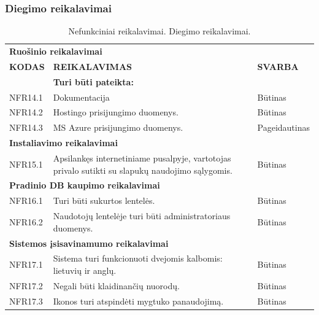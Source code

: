 \documentclass{VUMIFPSkursinis}
\begin{document}
\subsubsection{Diegimo reikalavimai}
\begin{table}[H]
\caption{Nefunkciniai reikalavimai. Diegimo reikalavimai.}
\centering
\normalsize
\begin{tabular}{|p{2cm}|p{10cm}|p{3cm}|}
\hline
\rowcolor{gray!30}
\multicolumn{3}{|l|}{\textbf{Diegimo reikalavimai}} \\ \hline
\multicolumn{3}{|l|}{\textbf{Ruošinio reikalavimai}} \\ \hline
\textbf{KODAS}& \multicolumn{1}{m{10cm}|}{\textbf{REIKALAVIMAS}} & \textbf{SVARBA} \\ \hline
& \multicolumn{2}{|l|}{\textbf{Turi būti pateikta: }} \\ \hline
NFR14.1 & \multicolumn{1}{m{10cm}|}{Dokumentacija} & Būtinas \\ \hline
NFR14.2 & \multicolumn{1}{m{10cm}|}{Hostingo prisijungimo duomenys.} & Būtinas \\ \hline
NFR14.3 & \multicolumn{1}{m{10cm}|}{MS Azure prisijungimo duomenys.} & Pageidautinas \\ \hline
\multicolumn{3}{|l|}{\textbf{Instaliavimo reikalavimai}} \\ \hline
NFR15.1 & \multicolumn{1}{m{10cm}|}{Apsilankęs internetiniame pusalpyje, vartotojas privalo sutikti su slapukų naudojimo sąlygomis.} & Būtinas \\ \hline
\multicolumn{3}{|l|}{\textbf{Pradinio DB kaupimo reikalavimai}} \\ \hline
NFR16.1 & \multicolumn{1}{m{10cm}|}{Turi būti sukurtos lentelės.} & Būtinas \\ \hline
NFR16.2 & \multicolumn{1}{m{10cm}|}{Naudotojų lentelėje turi būti administratoriaus duomenys.} & Būtinas \\ \hline
\multicolumn{3}{|l|}{\textbf{Sistemos įsisavinamumo reikalavimai}} \\ \hline
NFR17.1 & \multicolumn{1}{m{10cm}|}{Sistema turi funkcionuoti dvejomis kalbomis: lietuvių ir anglų.} & Būtinas \\ \hline
NFR17.2 & \multicolumn{1}{m{10cm}|}{Negali būti klaidinančių nuorodų.} & Būtinas \\ \hline
NFR17.3 & \multicolumn{1}{m{10cm}|}{Ikonos turi atspindėti mygtuko panaudojimą.} & Būtinas \\ \hline
\end{tabular}
\end{table}
\end{document}
